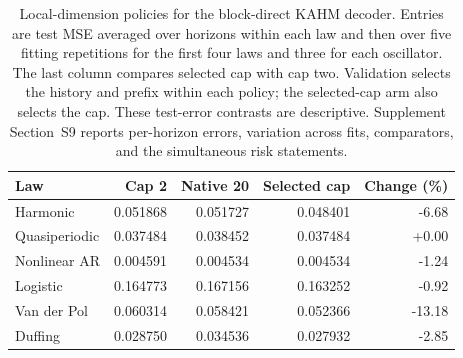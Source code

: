\begin{table}[t]
\centering\small
\begin{tabular}{@{}lrrrr@{}}
\toprule
Law & Cap 2 & Native 20 & Selected cap & Change (\%) \\
\midrule
Harmonic & 0.051868 & 0.051727 & 0.048401 & -6.68 \\
Quasiperiodic & 0.037484 & 0.038452 & 0.037484 & +0.00 \\
Nonlinear AR & 0.004591 & 0.004534 & 0.004534 & -1.24 \\
Logistic & 0.164773 & 0.167156 & 0.163252 & -0.92 \\
Van der Pol & 0.060314 & 0.058421 & 0.052366 & -13.18 \\
Duffing & 0.028750 & 0.034536 & 0.027932 & -2.85 \\
\bottomrule
\end{tabular}
\caption{Local-dimension policies for the block-direct KAHM decoder.
Entries are test MSE averaged over horizons within each law and then
over five fitting repetitions for the first four laws and three for each
oscillator. The last column compares selected cap with cap two.
Validation selects the history and prefix within each policy; the
selected-cap arm also selects the cap. These test-error contrasts are
descriptive. Supplement Section~S9 reports per-horizon errors,
variation across fits, comparators, and the simultaneous risk statements.}
\label{tab:dimension-policy-summary}
\end{table}
